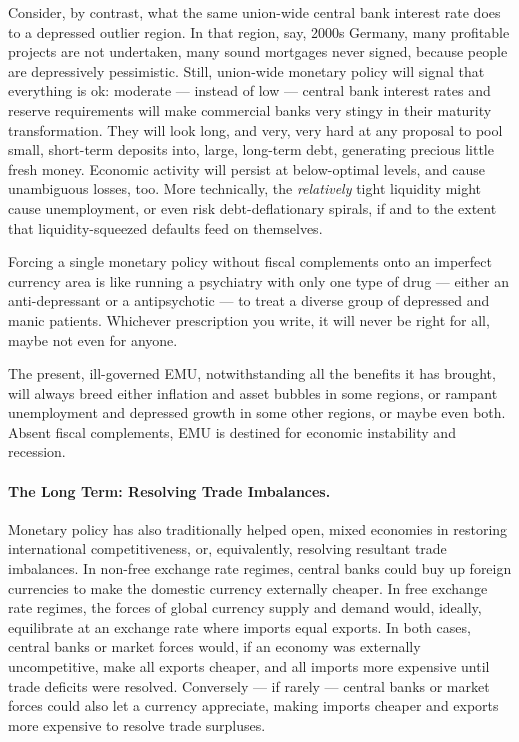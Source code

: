 Consider, by contrast, what the same union-wide central bank interest rate does to a depressed outlier region. In that region, say, 2000s Germany, many profitable projects are not undertaken, many sound mortgages never signed, because people are depressively pessimistic. Still, union-wide monetary policy will signal that everything is ok: moderate --- instead of low --- central bank interest rates and reserve requirements will make commercial banks very stingy in their maturity transformation. They will look long, and very, very hard at any proposal to pool small, short-term deposits into, large, long-term debt, generating precious little fresh money. Economic activity will persist at below-optimal levels, and cause unambiguous losses, too. More technically, the \emph{relatively} tight liquidity might cause unemployment, or even risk debt-deflationary spirals, if and to the extent that liquidity-squeezed defaults feed on themselves.

Forcing a single monetary policy without fiscal complements onto an imperfect currency area is like running a psychiatry with only one type of drug --- either an anti-depressant or a antipsychotic --- to treat a diverse group of depressed and manic patients. Whichever prescription you write, it will never be right for all, maybe not even for anyone.

The present, ill-governed \gls{EMU}, notwithstanding all the benefits it has brought, will always breed either inflation and asset bubbles in some regions, or rampant unemployment and depressed growth in some other regions, or maybe even both. Absent fiscal complements, \gls{EMU} is destined for economic instability and recession.

\paragraph[Long Term]{The Long Term: Resolving Trade Imbalances.} Monetary policy has also traditionally helped open, mixed economies in restoring international competitiveness, or, equivalently, resolving resultant trade imbalances. In non-free exchange rate regimes, central banks could buy up foreign currencies to make the domestic currency externally cheaper. In free exchange rate regimes, the forces of global currency supply and demand would, ideally, equilibrate at an exchange rate where imports equal exports. In both cases, central banks or market forces would, if an economy was externally uncompetitive, make all exports cheaper, and all imports more expensive until trade deficits were resolved. Conversely --- if rarely --- central banks or market forces could also let a currency appreciate, making imports cheaper and exports more expensive to resolve trade surpluses.

